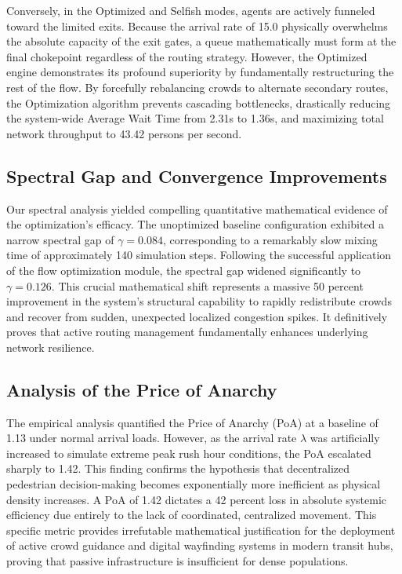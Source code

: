 \documentclass[conference]{IEEEtran}
\begin{document}
Conversely, in the Optimized and Selfish modes, agents are actively funneled toward the limited exits. Because the arrival rate of 15.0 physically overwhelms the absolute capacity of the exit gates, a queue mathematically must form at the final chokepoint regardless of the routing strategy. However, the Optimized engine demonstrates its profound superiority by fundamentally restructuring the rest of the flow. By forcefully rebalancing crowds to alternate secondary routes, the Optimization algorithm prevents cascading bottlenecks, drastically reducing the system-wide Average Wait Time from 2.31s to 1.36s, and maximizing total network throughput to 43.42 persons per second.

\subsection{Spectral Gap and Convergence Improvements}
Our spectral analysis yielded compelling quantitative mathematical evidence of the optimization's efficacy. The unoptimized baseline configuration exhibited a narrow spectral gap of $\gamma = 0.084$, corresponding to a remarkably slow mixing time of approximately 140 simulation steps. Following the successful application of the flow optimization module, the spectral gap widened significantly to $\gamma = 0.126$. This crucial mathematical shift represents a massive 50 percent improvement in the system's structural capability to rapidly redistribute crowds and recover from sudden, unexpected localized congestion spikes. It definitively proves that active routing management fundamentally enhances underlying network resilience.

\subsection{Analysis of the Price of Anarchy}
The empirical analysis quantified the Price of Anarchy (PoA) at a baseline of 1.13 under normal arrival loads. However, as the arrival rate $\lambda$ was artificially increased to simulate extreme peak rush hour conditions, the PoA escalated sharply to 1.42. This finding confirms the hypothesis that decentralized pedestrian decision-making becomes exponentially more inefficient as physical density increases. A PoA of 1.42 dictates a 42 percent loss in absolute systemic efficiency due entirely to the lack of coordinated, centralized movement. This specific metric provides irrefutable mathematical justification for the deployment of active crowd guidance and digital wayfinding systems in modern transit hubs, proving that passive infrastructure is insufficient for dense populations.
\end{document}
